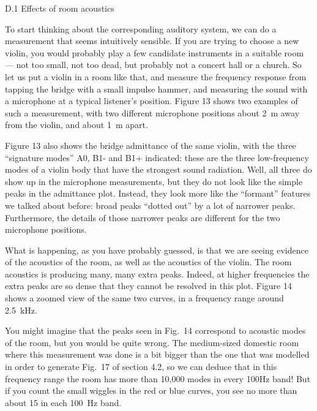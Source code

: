   D.1 Effects of room acoustics 

  To start thinking about the corresponding auditory system, we can do a 
  measurement that seems intuitively sensible. If you are trying to choose a 
  new violin, you would probably play a few candidate instruments in a suitable 
  room — not too small, not too dead, but probably not a concert hall or a 
  church. So let us put a violin in a room like that, and measure the frequency 
  response from tapping the bridge with a small impulse hammer, and measuring 
  the sound with a microphone at a typical listener’s position. Figure 13 shows 
  two examples of such a measurement, with two different microphone positions 
  about 2~m away from the violin, and about 1~m apart. 


  Figure 13 also shows the bridge admittance of the same violin, with the three 
  “signature modes” A0, B1- and B1+ indicated: these are the three 
  low-frequency modes of a violin body that have the strongest sound radiation. 
  Well, all three do show up in the microphone measurements, but they do not 
  look like the simple peaks in the admittance plot. Instead, they look more 
  like the “formant” features we talked about before: broad peaks “dotted out” 
  by a lot of narrower peaks. Furthermore, the details of those narrower peaks 
  are different for the two microphone positions. 

  What is happening, as you have probably guessed, is that we are seeing 
  evidence of the acoustics of the room, as well as the acoustics of the 
  violin. The room acoustics is producing many, many extra peaks. Indeed, at 
  higher frequencies the extra peaks are so dense that they cannot be resolved 
  in this plot. Figure 14 shows a zoomed view of the same two curves, in a 
  frequency range around 2.5~kHz. 


  You might imagine that the peaks seen in Fig.\ 14 correspond to acoustic 
  modes of the room, but you would be quite wrong. The medium-sized domestic 
  room where this measurement was done is a bit bigger than the one that was 
  modelled in order to generate Fig.\ 17 of section 4.2, so we can deduce that 
  in this frequency range the room has more than 10,000 modes in every 100Hz 
  band! But if you count the small wiggles in the red or blue curves, you see 
  no more than about 15 in each 100~Hz band. 


